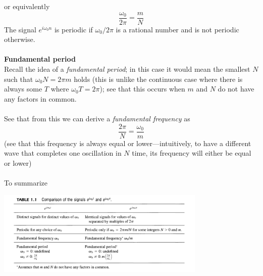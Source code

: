 \documentclass{report}
\begin{document}
or equivalently
\begin{equation*}
\frac{\omega_0}{2\pi}=\frac{m}{N}
\end{equation*}
The signal $e^{i\omega_0n}$ is periodic if $\omega_0/2\pi$ is a rational number and is not periodic otherwise.\\
\vspace{1mm}\\
\textbf{Fundamental period}\\
Recall the idea of a \textit{fundamental period}; in this case it would mean the smallest $N$ such that 
$\omega_0N=2\pi m$ holds (this is unlike the continuous case where there is always some $T$ where $\omega_0T=2\pi$); see that this occurs when $m$ and $N$ do not have any factors in common.\\
\vspace{1mm}\\
See that from this we can derive a \textit{fundamental frequency} as
\begin{equation*}
\frac{2\pi}{N}=\frac{\omega_0}{m}
\end{equation*}
(see that this frequency is always equal or lower---intuitively, to have a different wave that completes one
oscillation in $N$ time, its frequency will either be equal or lower)\\
\vspace{1mm}\\
To summarize
\begin{center}
\includegraphics[width=10cm]{a2}
\end{center}
\newpage
\end{document}
